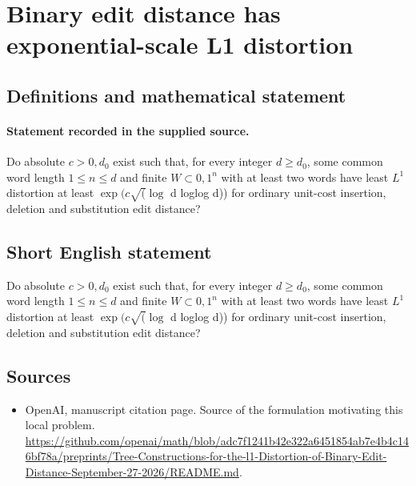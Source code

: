 \documentclass[11pt]{article}
\begin{document}
\section*{Binary edit distance has exponential-scale L1 distortion}\label{30007112}
\subsection{Definitions and mathematical statement}
\paragraph{Statement recorded in the supplied source.}
Do absolute $c>0,d_{0}$ exist such that, for every integer $d\geq d_{0}$, some common word length $1\leq n\leq d$ and finite $W\subset {0,1}^{n}$ with at least two words have least $L^{1}$ distortion at least $\exp (c\surd (\log $ d loglog d)) for ordinary unit-cost insertion, deletion and substitution edit distance?
\subsection{Short English statement}
Do absolute $c>0,d_{0}$ exist such that, for every integer $d\geq d_{0}$, some common word length $1\leq n\leq d$ and finite $W\subset {0,1}^{n}$ with at least two words have least $L^{1}$ distortion at least $\exp (c\surd (\log $ d loglog d)) for ordinary unit-cost insertion, deletion and substitution edit distance?
\subsection{Sources}
\begin{itemize}
\item[S1] OpenAI, manuscript citation page. Source of the formulation motivating this local problem.
\url{https://github.com/openai/math/blob/adc7f1241b42e322a6451854ab7e4b4c146bf78a/preprints/Tree-Constructions-for-the-l1-Distortion-of-Binary-Edit-Distance-September-27-2026/README.md}.
\end{itemize}
\end{document}

